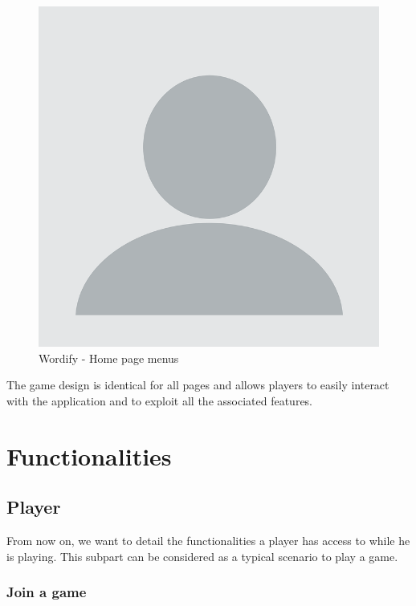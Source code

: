 \documentclass{tnreport}
\begin{document}
\begin{figure}[ht]
	\centering
	\fboxsep=1.2pt
	\includegraphics[scale=0.3]{figures/no_picture}
	\caption{Wordify - Home page menus}
	\label{fig:wordify_home_page_menus}
\end{figure} 

The game design is identical for all pages and allows players to easily interact with the application and to exploit all the associated features. 

\section{Functionalities}

\subsection{Player}

From now on, we want to detail the functionalities a player has access to while he is playing. This subpart can be considered as a typical scenario to play a game. 

\subsubsection{Join a game}
\end{document}
